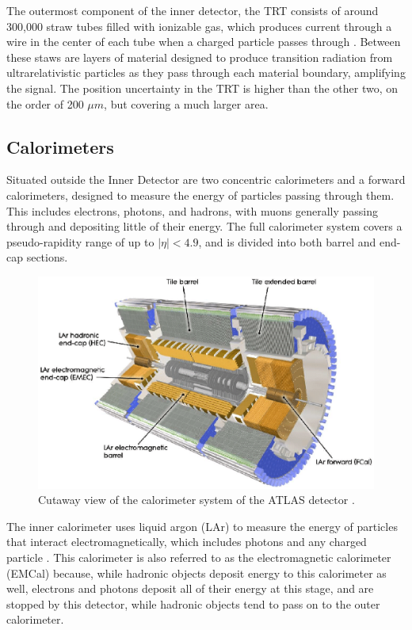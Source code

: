 The outermost component of the inner detector, the TRT consists of around 300,000 straw tubes filled with ionizable gas, which produces current through a wire in the center of each tube when a charged particle passes through \cite{IDET-2015-01}. Between these staws are layers of material designed to produce transition radiation from ultrarelativistic particles as they pass through each material boundary, amplifying the signal. The position uncertainty in the TRT is higher than the other two, on the order of 200 $\mu m$, but covering a much larger area. 

\subsection{Calorimeters}
\label{sec:calo}

Situated outside the Inner Detector are two concentric calorimeters and a forward calorimeters, designed to measure the energy of particles passing through them. This includes electrons, photons, and hadrons, with muons generally passing through and depositing little of their energy. The full calorimeter system covers a pseudo-rapidity range of up to $|\eta|<4.9$, and is divided into both barrel and end-cap sections.

\begin{figure}[H]
\centering
   \includegraphics[width=0.9\linewidth]{figures/lhc/calorimeter.eps}
\caption{Cutaway view of the calorimeter system of the ATLAS detector \cite{caloFig}.}
\label{fig:calo}
\end{figure}

The inner calorimeter uses liquid argon (LAr) to measure the  energy of particles that interact electromagnetically, which includes photons and any charged particle \cite{LARG-2009-01}. This calorimeter is also referred to as the electromagnetic calorimeter (EMCal) because, while hadronic objects deposit energy to this calorimeter as well, electrons and photons deposit all of their energy at this stage, and are stopped by this detector, while hadronic objects tend to pass on to the outer calorimeter. 

